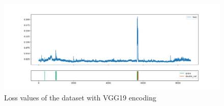 \begin{figure}[!ht]
    \centering
    \includegraphics[width=\textwidth]{./results/vgg19_vgg19/20230510_172958_feature_vectors_loss.png}
    \caption{Loss values of the dataset with VGG19 encoding}
    \label{fig:vgg19_loss}
\end{figure}